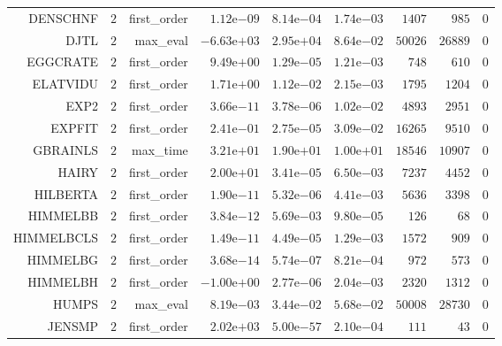 \begin{longtable}{rrrrrrrrr}
DENSCHNF & \(     2\) & first\_order & \( 1.12\)e\(-09\) & \( 8.14\)e\(-04\) & \( 1.74\)e\(-03\) & \(  1407\) & \(   985\) & \(     0\) \\
DJTL & \(     2\) & max\_eval & \(-6.63\)e\(+03\) & \( 2.95\)e\(+04\) & \( 8.64\)e\(-02\) & \( 50026\) & \( 26889\) & \(     0\) \\
EGGCRATE & \(     2\) & first\_order & \( 9.49\)e\(+00\) & \( 1.29\)e\(-05\) & \( 1.21\)e\(-03\) & \(   748\) & \(   610\) & \(     0\) \\
ELATVIDU & \(     2\) & first\_order & \( 1.71\)e\(+00\) & \( 1.12\)e\(-02\) & \( 2.15\)e\(-03\) & \(  1795\) & \(  1204\) & \(     0\) \\
EXP2 & \(     2\) & first\_order & \( 3.66\)e\(-11\) & \( 3.78\)e\(-06\) & \( 1.02\)e\(-02\) & \(  4893\) & \(  2951\) & \(     0\) \\
EXPFIT & \(     2\) & first\_order & \( 2.41\)e\(-01\) & \( 2.75\)e\(-05\) & \( 3.09\)e\(-02\) & \( 16265\) & \(  9510\) & \(     0\) \\
GBRAINLS & \(     2\) & max\_time & \( 3.21\)e\(+01\) & \( 1.90\)e\(+01\) & \( 1.00\)e\(+01\) & \( 18546\) & \( 10907\) & \(     0\) \\
HAIRY & \(     2\) & first\_order & \( 2.00\)e\(+01\) & \( 3.41\)e\(-05\) & \( 6.50\)e\(-03\) & \(  7237\) & \(  4452\) & \(     0\) \\
HILBERTA & \(     2\) & first\_order & \( 1.90\)e\(-11\) & \( 5.32\)e\(-06\) & \( 4.41\)e\(-03\) & \(  5636\) & \(  3398\) & \(     0\) \\
HIMMELBB & \(     2\) & first\_order & \( 3.84\)e\(-12\) & \( 5.69\)e\(-03\) & \( 9.80\)e\(-05\) & \(   126\) & \(    68\) & \(     0\) \\
HIMMELBCLS & \(     2\) & first\_order & \( 1.49\)e\(-11\) & \( 4.49\)e\(-05\) & \( 1.29\)e\(-03\) & \(  1572\) & \(   909\) & \(     0\) \\
HIMMELBG & \(     2\) & first\_order & \( 3.68\)e\(-14\) & \( 5.74\)e\(-07\) & \( 8.21\)e\(-04\) & \(   972\) & \(   573\) & \(     0\) \\
HIMMELBH & \(     2\) & first\_order & \(-1.00\)e\(+00\) & \( 2.77\)e\(-06\) & \( 2.04\)e\(-03\) & \(  2320\) & \(  1312\) & \(     0\) \\
HUMPS & \(     2\) & max\_eval & \( 8.19\)e\(-03\) & \( 3.44\)e\(-02\) & \( 5.68\)e\(-02\) & \( 50008\) & \( 28730\) & \(     0\) \\
JENSMP & \(     2\) & first\_order & \( 2.02\)e\(+03\) & \( 5.00\)e\(-57\) & \( 2.10\)e\(-04\) & \(   111\) & \(    43\) & \(     0\) \\

\end{longtable}
